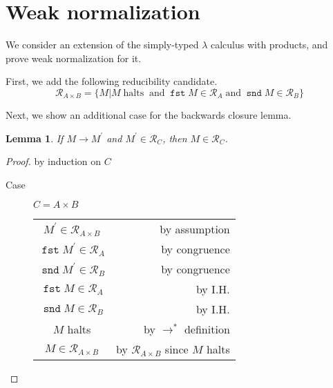 \documentclass[letterpaper,11pt]{article}
\newtheorem{lemma}{Lemma}
\newcommand{\step}{\rightarrow}
\newcommand{\R}{\mathcal{R}}
\DeclareMathOperator{\fst}{\mathtt{fst}}
\DeclareMathOperator{\snd}{\mathtt{snd}}
\begin{document}
\section{Weak normalization}

We consider an extension of the simply-typed $\lambda$ calculus with products,
and prove weak normalization for it.

First, we add the following reducibility candidate.
\begin{equation*}
    \mathcal{R}_{A \times B} = \{ M
        | M \;\text{halts}\;
        \;\text{and}\; \fst{M} \in \mathcal{R}_A
        \;\text{and}\; \snd{M} \in \mathcal{R}_B
    \}
\end{equation*}

Next, we show an additional case for the backwards closure lemma.

\begin{lemma}
    If $M \step M^\prime$ and $M^\prime \in \R_C$, then $M \in \R_C$.
\end{lemma}

\begin{proof} by induction on $C$

    \begin{description}
        \item[Case] $C = A \times B$

            \begin{center}
                \begin{tabular}{c r}
                    $M^\prime \in \R_{A \times B}$
                    &
                    by assumption \\
                    $\fst M^\prime \in \R_A$
                    &
                    by congruence \\
                    $\snd M^\prime \in \R_B$
                    &
                    by congruence \\
                    $\fst M \in \R_A$
                    &
                    by I.H. \\
                    $\snd M \in \R_B$
                    &
                    by I.H. \\
                    $M$ halts
                    &
                    by $\step^*$ definition \\
                    $M \in \R_{A \times B}$
                    &
                    by $\R_{A \times B}$ since $M$ halts
                \end{tabular}
            \end{center}
    \end{description}
\end{proof}
\end{document}
